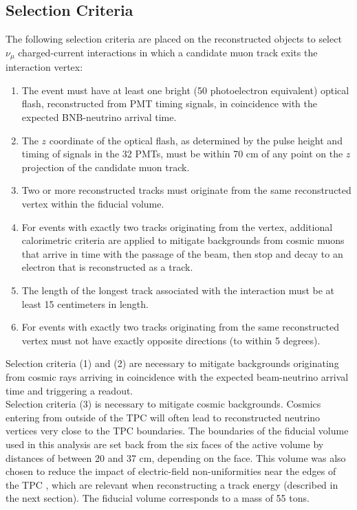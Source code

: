 \subsection{Selection Criteria}\label{kaon_event_selection_section}
The following selection criteria are placed on the reconstructed objects to select $\nu_\mu$ charged-current interactions in which a candidate muon track exits the interaction vertex:

\begin{enumerate}
\item The event must have at least one bright (50 photoelectron equivalent) optical flash, reconstructed from PMT timing signals, in coincidence with the expected BNB-neutrino arrival time. %
\item The $z$ coordinate of the optical flash, as determined by the pulse height and timing of signals in the 32 PMTs, must be within 70 cm of any point on the $z$ projection of the candidate muon track. %
\item Two or more reconstructed tracks must originate from the same reconstructed vertex within the fiducial volume. %
\item For events with exactly two tracks originating from the vertex, additional calorimetric criteria are applied to mitigate backgrounds from cosmic muons that arrive in time with the passage of the beam, then stop and decay to an electron that is reconstructed as a track. %
\item The length of the longest track associated with the interaction must be at least 15 centimeters in length.
\item For events with exactly two tracks originating from the same reconstructed vertex must not have exactly opposite directions (to within 5 degrees).
\end{enumerate}

Selection criteria (1) and (2) are necessary to mitigate backgrounds originating from cosmic rays arriving in coincidence with the expected beam-neutrino arrival time and triggering a readout. \\

Selection criteria (3) is necessary to mitigate cosmic backgrounds. Cosmics entering from outside of the TPC will often lead to reconstructed neutrino vertices very close to the TPC boundaries. The boundaries of the fiducial volume used in this analysis are set back from the six faces of the active volume by distances of between 20 and 37 cm, depending on the face. This volume was also chosen to reduce the impact of electric-field non-uniformities near the edges of the TPC \cite{SCE_publicnote}, which are relevant when reconstructing a track energy (described in the next section). The fiducial volume corresponds to a mass of 55 tons.\\

